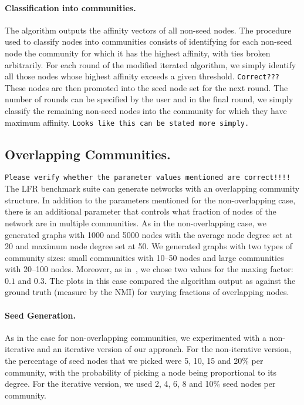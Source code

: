 \paragraph{Classification into communities.}
The algorithm outputs the affinity vectors of all non-seed nodes. The procedure 
used to classify nodes into communities consists of identifying for each non-seed 
node the community for which it has the highest affinity, with ties broken arbitrarily. 
For each round of the modified iterated algorithm, we simply identify all those nodes 
whose highest affinity exceeds a given threshold. \texttt{Correct???} These nodes are then 
promoted into the seed node set for the next round. The number of rounds can be specified by 
the user and in the final round, we simply classify the remaining non-seed nodes into the community
for which they have maximum affinity. \texttt{Looks like this can be stated more simply.}

\subsection{Overlapping Communities.}
\texttt{Please verify whether the parameter values mentioned are correct!!!!}
The LFR benchmark suite can generate networks with an overlapping community structure. 
In addition to the parameters mentioned for the non-overlapping case, there is an additional 
parameter that controls what fraction of nodes of the network are in multiple communities. 
As in the non-overlapping case, we generated graphs with 1000 and 5000 nodes with the average
node degree set at 20 and maximum node degree set at 50. We generated graphs with two types 
of community sizes: small communities with 10--50 nodes and large communities with 20--100 nodes.
Moreover, as in~\cite{LF09}, we chose two values for the maxing factor: $0.1$ and $0.3$. 
The plots in this case compared the algorithm output as against the ground truth (measure by 
the NMI) for varying fractions of overlapping nodes. 

\paragraph{Seed Generation.}
As in the case for non-overlapping communities, we experimented with a non-iterative 
and an iterative version of our approach. For the non-iterative version, the percentage 
of seed nodes that we picked were 5, 10, 15 and 20$\%$ per community, with the probability
of picking a node being proportional to its degree. For the iterative version, we used 
2, 4, 6, 8 and 10$\%$ seed nodes per community. 

